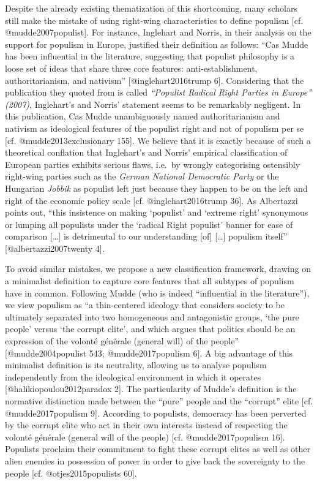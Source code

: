 \documentclass[]{article}
\begin{document}
Despite the already existing thematization of this shortcoming, many
scholars still make the mistake of using right-wing characteristics to
define populism {[}cf. @mudde2007populist{]}. For instance, Inglehart
and Norris, in their analysis on the support for populism in Europe,
justified their definition as follows: ``Cas Mudde has been influential
in the literature, suggesting that populist philosophy is a loose set of
ideas that share three core features: anti-establishment,
authoritarianism, and nativism'' {[}@inglehart2016trump 6{]}.
Considering that the publication they quoted from is called
\emph{``Populist Radical Right Parties in Europe'' (2007)}, Inglehart's
and Norris' statement seems to be remarkably negligent. In this
publication, Cas Mudde unambiguously named authoritarianism and nativism
as ideological features of the populist right and not of populism per se
{[}cf. @mudde2013exclusionary 155{]}. We believe that it is exactly
because of such a theoretical conflation that Inglehart's and Norris'
empirical classification of European parties exhibits serious flaws,
i.e.~by wrongly categorising ostensibly right-wing parties such as the
\emph{German National Democratic Party} or the Hungarian \emph{Jobbik}
as populist left just because they happen to be on the left and right of
the economic policy scale {[}cf. @inglehart2016trump 36{]}. As
Albertazzi points out, ``this insistence on making `populist' and
`extreme right' synonymous or lumping all populists under the `radical
Right populist' banner for ease of comparison {[}\ldots{}{]} is
detrimental to our understanding {[}of{]} {[}\ldots{}{]} populism
itself'' {[}@albertazzi2007twenty 4{]}.

To avoid similar mistakes, we propose a new classification framework,
drawing on a minimalist definition to capture core features that all
subtypes of populism have in common. Following Mudde (who is indeed
``influential in the literature''), we view populism as ``a
thin-centered ideology that considers society to be ultimately separated
into two homogeneous and antagonistic groups, `the pure people' versus
`the corrupt elite', and which argues that politics should be an
expression of the volonté générale (general will) of the people''
{[}@mudde2004populist 543; @mudde2017populism 6{]}. A big advantage of
this minimalist definition is its neutrality, allowing us to analyse
populism independently from the ideological environment in which it
operates {[}@halikiopoulou2012paradox 2{]}. The particularity of Mudde's
definition is the normative distinction made between the ``pure'' people
and the ``corrupt'' elite {[}cf. @mudde2017populism 9{]}. According to
populists, democracy has been perverted by the corrupt elite who act in
their own interests instead of respecting the volonté générale (general
will of the people) {[}cf. @mudde2017populism 16{]}. Populists proclaim
their commitment to fight these corrupt elites as well as other alien
enemies in possession of power in order to give back the sovereignty to
the people {[}cf. @otjes2015populists 60{]}.
\end{document}
